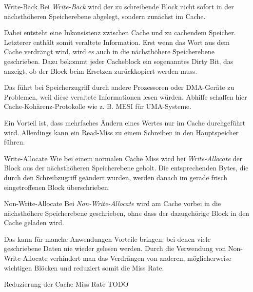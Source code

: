 \begin{defi}[Schreibstrategie]{Write-Back}
    Bei \emph{Write-Back} wird der zu schreibende Block nicht sofort in der nächsthöheren Speicherebene abgelegt, sondern zunächst im Cache.

    Dabei entsteht eine Inkonsistenz zwischen Cache und zu cachendem Speicher.
    Letzterer enthält somit veraltete Information.
    Erst wenn das Wort aus dem Cache verdrängt wird, wird es auch in die nächsthöhere Speicherebene geschrieben.
    Dazu bekommt jeder Cacheblock ein sogenanntes Dirty Bit, das anzeigt, ob der Block beim Ersetzen zurückkopiert werden muss.

    Das führt bei Speicherzugriff durch andere Prozessoren oder DMA-Geräte zu Problemen, weil diese veraltete Informationen lesen würden.
    Abhilfe schaffen hier Cache-Kohärenz-Protokolle wie z. B. MESI für UMA-Systeme.

    Ein Vorteil ist, dass mehrfaches Ändern eines Wertes nur im Cache durchgeführt wird.
    Allerdings kann ein Read-Miss zu einem Schreiben in den Hauptspeicher führen.
\end{defi}

\begin{bonus}[Schreibstrategie]{Write-Allocate}
    Wie bei einem normalen Cache Miss wird bei \emph{Write-Allocate} der Block aus der nächsthöheren Speicherebene geholt.
    Die entsprechenden Bytes, die durch den Schreibzugriff geändert wurden, werden danach im gerade frisch eingetroffenen Block überschrieben.
\end{bonus}

\begin{bonus}[Schreibstrategie]{Non-Write-Allocate}
    Bei \emph{Non-Write-Allocate} wird am Cache vorbei in die nächsthöhere Speicherebene geschrieben, ohne dass der dazugehörige Block in den Cache geladen wird.

    Das kann für manche Anwendungen Vorteile bringen, bei denen viele geschriebene Daten nie wieder gelesen werden.
    Durch die Verwendung von Non-Write-Allocate verhindert man das Verdrängen von anderen, möglicherweise wichtigen Blöcken und reduziert somit die Miss Rate.
\end{bonus}

\begin{defi}{Reduzierung der Cache Miss Rate}
    TODO
\end{defi}

